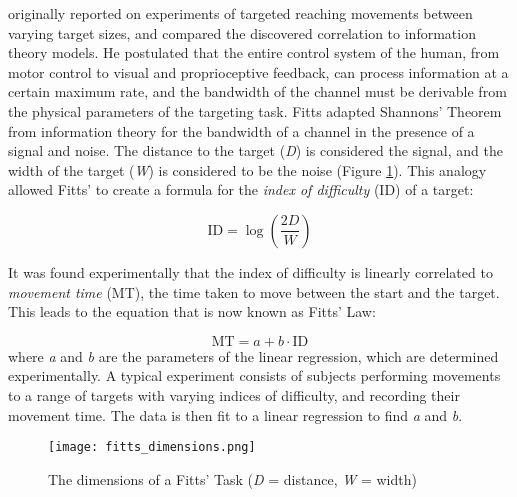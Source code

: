 \citet{fitts_information_1954} originally reported on experiments of targeted reaching movements between varying target sizes, and compared the discovered correlation to information theory models.
He postulated that the entire control system of the human, from motor control to visual and proprioceptive feedback, can process information at a certain maximum rate, and the bandwidth of the channel must be derivable from the physical parameters of the targeting task.
Fitts adapted Shannons' Theorem \citep{shannon_communication_1949} from information theory for the bandwidth of a channel in the presence of a signal and noise.
The distance to the target (\emph{D}) is considered the signal, and the width of the target (\emph{W}) is considered to be the noise (Figure \ref{fig:intro_fitts}).
This analogy allowed Fitts' to create a formula for the \emph{index of difficulty} (\(\text{ID}\)) of a target:

\begin{equation}
    \mathrm{ID} = \log\left(\frac{2D}{W}\right)
    \label{eq:intro_id}
\end{equation}

It was found experimentally that the index of difficulty is linearly correlated to \emph{movement time} (MT), the time taken to move between the start and the target.
This leads to the equation that is now known as Fitts' Law:

\begin{equation}
    \mathrm{MT} = a + b \cdot \mathrm{ID}
\end{equation}
where \emph{a} and \emph{b} are the parameters of the linear regression, which are determined experimentally.
A typical experiment consists of subjects performing movements to a range of targets with varying indices of difficulty, and recording their movement time.
The data is then fit to a linear regression to find \emph{a} and \emph{b}.

\begin{figure}
    \centering
    \texttt{[image: fitts\_dimensions.png]}
    \caption{The dimensions of a Fitts' Task (\emph{D} = distance, \emph{W} = width)}
    \label{fig:intro_fitts}
\end{figure}

